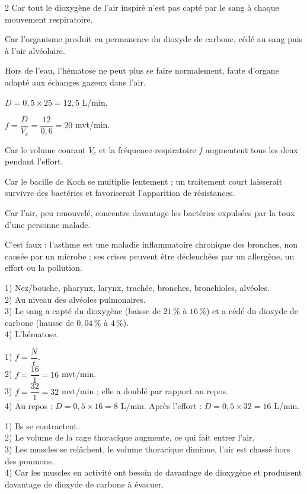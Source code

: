 \begin{multicols}{2}
Car tout le dioxygène de l'air inspiré n'est pas capté par le sang à chaque
mouvement respiratoire.

Car l'organisme produit en permanence du dioxyde de carbone, cédé au sang puis à
l'air alvéolaire.

Hors de l'eau, l'hématose ne peut plus se faire normalement, faute d'organe adapté
aux échanges gazeux dans l'air.

$D=0{,}5\times25=12{,}5$ L/min.

$f=\dfrac D{V_c}=\dfrac{12}{0{,}6}=20$ mvt/min.

Car le volume courant $V_c$ et la fréquence respiratoire $f$ augmentent tous les
deux pendant l'effort.

Car le bacille de Koch se multiplie lentement ; un traitement court laisserait
survivre des bactéries et favoriserait l'apparition de résistances.

Car l'air, peu renouvelé, concentre davantage les bactéries expulsées par la toux
d'une personne malade.

C'est faux : l'asthme est une maladie inflammatoire chronique des bronches, non
causée par un microbe ; ses crises peuvent être déclenchées par un allergène, un
effort ou la pollution.

1) Nez/bouche, pharynx, larynx, trachée, bronches, bronchioles, alvéoles.\\
2) Au niveau des alvéoles pulmonaires.\\
3) Le sang a capté du dioxygène (baisse de $21\,\%$ à $16\,\%$) et a cédé du dioxyde de
carbone (hausse de $0{,}04\,\%$ à $4\,\%$).\\
4) L'hématose.

1) $f=\dfrac Nt$.\\
2) $f=\dfrac{16}1=16$ mvt/min.\\
3) $f=\dfrac{32}1=32$ mvt/min ; elle a doublé par rapport au repos.\\
4) Au repos : $D=0{,}5\times16=8$ L/min. Après l'effort : $D=0{,}5\times32=16$ L/min.

1) Ils se contractent.\\
2) Le volume de la cage thoracique augmente, ce qui fait entrer l'air.\\
3) Les muscles se relâchent, le volume thoracique diminue, l'air est chassé hors des
poumons.\\
4) Car les muscles en activité ont besoin de davantage de dioxygène et produisent
davantage de dioxyde de carbone à évacuer.


\end{multicols}
